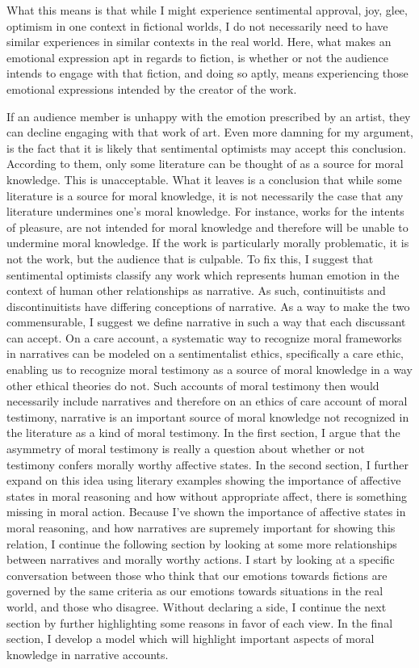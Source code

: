 \documentclass[12pt]{book}
\theoremstyle{definition}
\theoremstyle{remark}
\begin{document}
What this means is that while I might experience sentimental approval, joy, glee, optimism in one context in fictional worlds, I do not necessarily need to have similar experiences in similar contexts in the real world. Here, what makes an emotional expression apt in regards to fiction, is whether or not the audience intends to engage with that fiction, and doing so aptly, means experiencing those emotional expressions intended by the creator of the work.

If an audience member is unhappy with the emotion prescribed by an artist, they can decline engaging with that work of art. Even more damning for my argument, is the fact that it is likely that sentimental optimists may accept this conclusion. According to them, only some literature can be thought of as a source for moral knowledge. This is unacceptable. What it leaves is a conclusion that while some literature is a source for moral knowledge, it is not necessarily the case that any literature undermines one's moral knowledge. For instance, works for the intents of pleasure, are not intended for moral knowledge and therefore will be unable to undermine moral knowledge. If the work is particularly morally problematic, it is not the work, but the audience that is culpable. To fix this, I suggest that sentimental optimists classify any work which represents human emotion in the context of human other relationships as narrative. As such, continuitists and discontinuitists have differing conceptions of narrative. As a way to make the two commensurable, I suggest we define narrative in such a way that each discussant can accept. On a care account, a systematic way to recognize moral frameworks in narratives can be modeled on a sentimentalist ethics, specifically a care ethic, enabling us to recognize moral testimony as a source of moral knowledge in a way other ethical theories do not. Such accounts of moral testimony then would necessarily include narratives and therefore on an ethics of care account of moral testimony, narrative is an important source of moral knowledge not recognized in the literature as a kind of moral testimony. In the first section, I argue that the asymmetry of moral testimony is really a question about whether or not testimony confers morally worthy affective states. In the second section, I further expand on this idea using literary examples showing the importance of affective states in moral reasoning and how without appropriate affect, there is something missing in moral action. Because I've shown the importance of affective states in moral reasoning, and how narratives are supremely important for showing this relation, I continue the following section by looking at some more relationships between narratives and morally worthy actions. I start by looking at a specific conversation between those who think that our emotions towards fictions are governed by the same criteria as our emotions towards situations in the real world, and those who disagree. Without declaring a side, I continue the next section by further highlighting some reasons in favor of each view. In the final section, I develop a model which will highlight important aspects of moral knowledge in narrative accounts.
\end{document}

